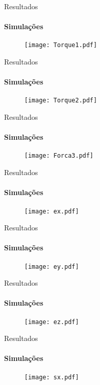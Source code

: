 \documentclass[25pt,landscape]{beamer}
\begin{document}
\begin{frame}{Resultados}
	\framesubtitle{Simula\c{c}\~oes}
	\begin{figure}[!h]
        \centering
        \texttt{[image: Torque1.pdf]}
    \end{figure}
\end{frame}

\begin{frame}{Resultados}
	\framesubtitle{Simula\c{c}\~oes}
	\begin{figure}[!h]
        \centering
        \texttt{[image: Torque2.pdf]}
    \end{figure}
\end{frame}

\begin{frame}{Resultados}
	\framesubtitle{Simula\c{c}\~oes}
	\begin{figure}[!h]
        \centering
        \texttt{[image: Forca3.pdf]}
    \end{figure}
\end{frame}

\begin{frame}{Resultados}
	\framesubtitle{Simula\c{c}\~oes}
	\begin{figure}[!h]
        \centering
        \texttt{[image: ex.pdf]}
    \end{figure}
\end{frame}

\begin{frame}{Resultados}
	\framesubtitle{Simula\c{c}\~oes}
	\begin{figure}[!h]
        \centering
        \texttt{[image: ey.pdf]}
    \end{figure}
\end{frame}

\begin{frame}{Resultados}
	\framesubtitle{Simula\c{c}\~oes}
	\begin{figure}[!h]
        \centering
        \texttt{[image: ez.pdf]}
    \end{figure}
\end{frame}

\begin{frame}{Resultados}
	\framesubtitle{Simula\c{c}\~oes}
	\begin{figure}[!h]
        \centering
        \texttt{[image: sx.pdf]}
    \end{figure}
\end{frame}
\end{document}
